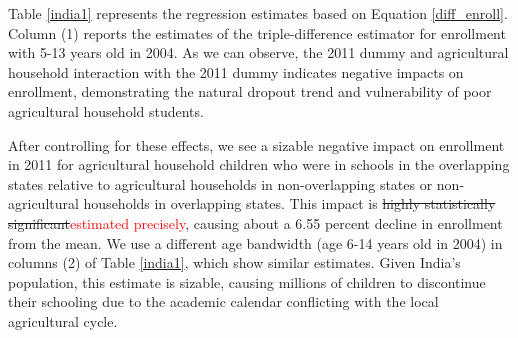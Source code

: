 \documentclass[12pt,letterpaper]{article}
\newcommand{\SAdded}[1]{\textcolor{red}{#1}}
\newcommand{\0}{\ensuremath{\mbox{\boldmath $0$}}}
\begin{document}

Table \ref{india1} represents the regression estimates based on Equation \ref{diff_enroll}. Column (1) reports the estimates of the triple-difference estimator for enrollment with 5-13 years old in 2004. As we can observe, the 2011 dummy and agricultural household interaction with the 2011 dummy indicates negative impacts on enrollment, demonstrating the natural dropout trend and vulnerability of poor agricultural household students.

After controlling for these effects, we see a sizable negative impact on enrollment in 2011 for agricultural household children who were in schools in the overlapping states relative to agricultural households in non-overlapping states or non-agricultural households in overlapping states. This impact is \sout{highly statistically significant}\SAdded{estimated precisely}, causing about a 6.55 percent decline in enrollment from the mean. We use a different age bandwidth (age 6-14 years old in 2004) in columns (2) of Table \ref{india1}, which show similar estimates. Given India's population, this estimate is sizable, causing millions of children to discontinue their schooling due to the academic calendar conflicting with the local agricultural cycle.  
\end{document}
